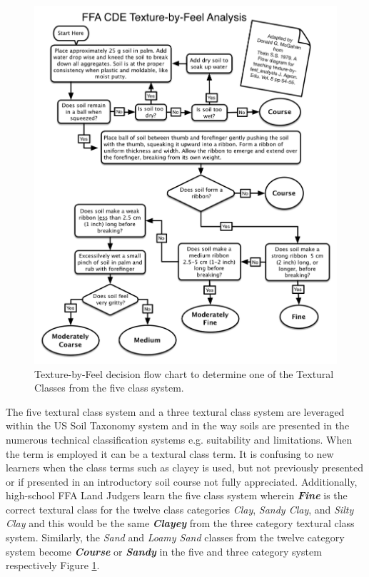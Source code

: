\documentclass[letterpaper, 12pt]{article}
\begin{document}
\begin{figure}
    \includegraphics[width=0.9\columnwidth]{images/Texture_by_feel_analysis_DecissionTree-LandEvaluation-FFA-CDE-bw.png}
    \caption{Texture-by-Feel decision flow chart to determine one of the Textural Classes from the five class system.}
    \label{fig:TextureByFeelFlowChart5class}
\end{figure}

The five textural class system and a three textural class system are leveraged within the US Soil Taxonomy system and in the way soils are presented in the numerous technical classification systems e.g. suitability and limitations. When the term \endcsname is employed it can be a textural  class term. It is confusing to new learners when the class terms such as clayey is used, but not previously presented or if presented in an introductory soil course not fully appreciated. Additionally, high-school FFA Land Judgers learn the five class system wherein \textbf{\textit{Fine}} is the correct textural class for the twelve class categories \textit{Clay}, \textit{Sandy Clay}, and \textit{Silty Clay} and this would be the same \textbf{\textit{Clayey}} from the three category textural class system. Similarly, the \textit{Sand} and \textit{Loamy Sand} classes from the twelve category system become \textbf{\textit{Course}} or \textbf{\textit{Sandy}} in the five and three category system respectively Figure \ref{fig:TextureByFeelFlowChart5class}.
\end{document}
